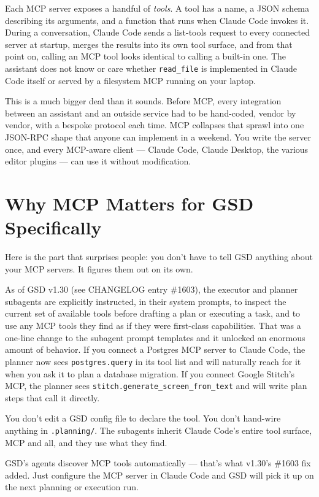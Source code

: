 \documentclass[11pt,letterpaper,openany]{book}
\begin{document}
Each MCP server exposes a handful of \emph{tools}. A tool has a name, a
JSON schema describing its arguments, and a function that runs when Claude
Code invokes it. During a conversation, Claude Code sends a list-tools
request to every connected server at startup, merges the results into its
own tool surface, and from that point on, calling an MCP tool looks
identical to calling a built-in one. The assistant does not know or care
whether \texttt{read\_file} is implemented in Claude Code itself or served
by a filesystem MCP running on your laptop.

This is a much bigger deal than it sounds. Before MCP, every integration
between an assistant and an outside service had to be hand-coded, vendor
by vendor, with a bespoke protocol each time. MCP collapses that sprawl
into one JSON-RPC shape that anyone can implement in a weekend. You write
the server once, and every MCP-aware client --- Claude Code, Claude
Desktop, the various editor plugins --- can use it without modification.

\section{Why MCP Matters for GSD Specifically}

Here is the part that surprises people: you don't have to tell GSD
anything about your MCP servers. It figures them out on its own.

As of GSD v1.30 (see CHANGELOG entry \#1603), the executor and planner
subagents are explicitly instructed, in their system prompts, to inspect
the current set of available tools before drafting a plan or executing a
task, and to use any MCP tools they find as if they were first-class
capabilities. That was a one-line change to the subagent prompt templates
and it unlocked an enormous amount of behavior. If you connect a Postgres
MCP server to Claude Code, the planner now sees \texttt{postgres.query}
in its tool list and will naturally reach for it when you ask it to plan
a database migration. If you connect Google Stitch's MCP, the planner
sees \texttt{stitch.generate\_screen\_from\_text} and will write plan
steps that call it directly.

You don't edit a GSD config file to declare the tool. You don't hand-wire
anything in \texttt{.planning/}. The subagents inherit Claude Code's
entire tool surface, MCP and all, and they use what they find.

\begin{gsdtip}
GSD's agents discover MCP tools automatically --- that's what v1.30's
\#1603 fix added. Just configure the MCP server in Claude Code and GSD
will pick it up on the next planning or execution run.
\end{gsdtip}
\end{document}
